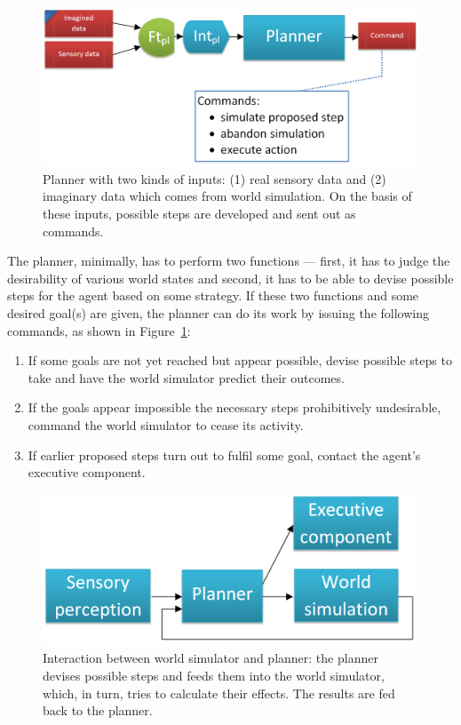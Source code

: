 \begin{figure}
	\centering
	\includegraphics[width=\textwidth]{figs/planner.png}
	\caption{Planner with two kinds of inputs: (1) real sensory data and (2) imaginary data which comes from world simulation. On the basis of these inputs, possible steps are developed and sent out as commands.}
	\label{fig:planner}
\end{figure}

The planner, minimally, has to perform two functions --- first, it has to judge the desirability of various world states and second, it has to be able to devise possible steps for the agent based on some strategy. If these two functions and some desired goal(s) are given, the planner can do its work by issuing the following commands, as shown in Figure~\ref{fig:planner}:
\begin{enumerate}
	\item If some goals are not yet reached but appear possible, devise possible steps to take and have the world simulator predict their outcomes.
	\item If the goals appear impossible the necessary steps prohibitively undesirable, command the world simulator to cease its activity.
	\item If earlier proposed steps turn out to fulfil some goal, contact the agent's executive component.
\end{enumerate}

\begin{figure}
	\centering
	\includegraphics[width=\textwidth]{figs/worldSimulatorPlannerInteraction.png}
	\caption{Interaction between world simulator and planner: the planner devises possible steps and feeds them into the world simulator, which, in turn, tries to calculate their effects. The results are fed back to the planner.}
	\label{fig:worldSimulatorPlannerInteraction}
\end{figure}

